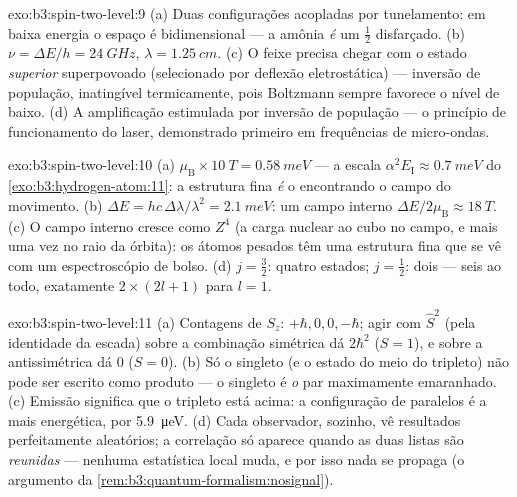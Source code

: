 \begin{solution}{exo:b3:spin-two-level:9}
(a) Duas configurações acopladas por tunelamento: em baixa energia o
espaço é bidimensional --- a amônia \emph{é} um  $\tfrac12$
disfarçado. (b) $\nu = \Delta E/h = \qty{24}{GHz}$, $\lambda =
\qty{1.25}{cm}$. (c) O feixe precisa chegar com o estado
\emph{superior} superpovoado (selecionado por deflexão eletrostática)
--- inversão de população, inatingível termicamente, pois Boltzmann
sempre favorece o nível de baixo. (d) A amplificação estimulada por
inversão de população --- o princípio de funcionamento do laser,
demonstrado primeiro em frequências de micro-ondas.
\end{solution}

\begin{solution}{exo:b3:spin-two-level:10}
(a) $\mu_{\text{B}} \times \qty{10}{T} = \qty{0.58}{meV}$ --- a escala
$\alpha^2E_{\text{I}} \approx \qty{0.7}{meV}$ do
\cref{exo:b3:hydrogen-atom:11}: a estrutura fina \emph{é} o 
encontrando o campo do movimento. (b) $\Delta E = hc\,\Delta\lambda/
\lambda^2 = \qty{2.1}{meV}$: um campo interno $\Delta E/2\mu_{
\text{B}} \approx \qty{18}{T}$. (c) O campo interno cresce como
$Z^4$ (a carga nuclear ao cubo no campo, e mais uma vez no raio da
órbita): os átomos pesados têm uma estrutura fina que se vê com um
espectroscópio de bolso. (d) $j = \tfrac32$: quatro estados;
$j = \tfrac12$: dois --- seis ao todo, exatamente $2 \times (2l + 1)$
para $l = 1$.
\end{solution}

\begin{solution}{exo:b3:spin-two-level:11}
(a) Contagens de $S_z$: $+\hbar, 0, 0, -\hbar$; agir com $\hat S^2$
(pela identidade da escada) sobre a combinação simétrica dá
$2\hbar^2$ ($S = 1$), e sobre a antissimétrica dá $0$ ($S = 0$). (b)
Só o singleto (e o estado do meio do tripleto) não pode ser escrito
como produto --- o singleto é \emph{o} par maximamente emaranhado. (c)
Emissão significa que o tripleto está acima: a configuração de 
paralelos é a mais energética, por \qty{5.9}{\micro eV}. (d)
Cada observador, sozinho, vê resultados perfeitamente aleatórios; a
correlação só aparece quando as duas listas são \emph{reunidas} ---
nenhuma estatística local muda, e por isso nada se propaga
(o argumento da \cref{rem:b3:quantum-formalism:nosignal}).
\end{solution}

